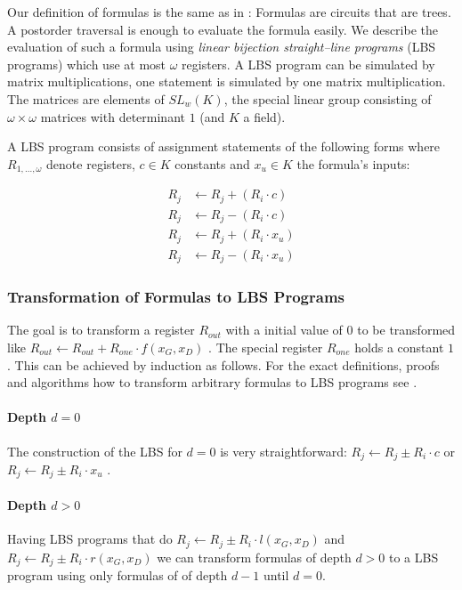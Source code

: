 \documentclass[12pt, a4paper]{article}
\begin{document}
Our definition of formulas is the same as in \cite{cleve91}: Formulas are
circuits that are trees. A postorder traversal is enough to evaluate the formula
easily. We describe the evaluation of such a formula using \emph{linear
bijection straight--line programs} (LBS programs)\cite{cleve91} which use at
most $\omega$ registers. A LBS program can be simulated by matrix
multiplications, one statement is simulated by one matrix multiplication. The
matrices are elements of $SL_w(K)$, the special linear group consisting of
$\omega \times \omega$ matrices with determinant $1$ (and $K$ a field).

A LBS program consists of assignment statements of the following
forms where $R_{1,...,\omega}$ denote registers, $c \in K$ constants and $x_u
\in K$ the formula's inputs:

\begin{align}
R_j & \leftarrow R_j + (R_i \cdot c) \\
R_j & \leftarrow R_j - (R_i \cdot c) \\
R_j & \leftarrow R_j + (R_i \cdot x_u) \\
R_j & \leftarrow R_j - (R_i \cdot x_u)
\end{align}


\subsubsection{Transformation of Formulas to LBS Programs}

The goal is to transform a register $R_{out}$ with a initial value of $0$ to be
transformed like $R_{out} \leftarrow R_{out} + R_{one} \cdot f(x_G,x_D)$ . The
special register $R_{one}$ holds a constant $1$. This can be achieved by
induction as follows.  For the exact definitions, proofs and algorithms how to
transform arbitrary formulas to LBS programs see \cite{cleve91}.


\paragraph{Depth $d = 0$}

The construction of the LBS for $d = 0$ is very straightforward:
$R_j \leftarrow R_j \pm R_i \cdot c$ or $R_j \leftarrow R_j \pm R_i \cdot x_u$ .


\paragraph{Depth $d > 0$}

Having LBS programs that do $R_j \leftarrow R_j \pm R_i \cdot l(x_G, x_D)$  and
$R_j \leftarrow R_j \pm R_i \cdot r(x_G, x_D)$ we can
transform formulas of depth $d > 0$ to a LBS program using only formulas of
of depth $d - 1$ until $d = 0$.
\end{document}
